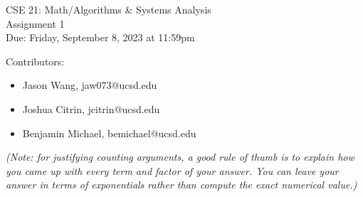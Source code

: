 \documentclass[10pt,letterpaper,unboxed,cm]{article}
\begin{document}
\begin{center}
{\LARGE CSE 21: Math/Algorithms \& Systems Analysis}\\
{\Large Assignment 1}\\
{\large Due: Friday, September 8, 2023 at 11:59pm}
\end{center}


{\large Contributors:}
\begin{itemize}
    \item Jason Wang, jaw073@ucsd.edu
    \item Joshua Citrin, jcitrin@ucsd.edu
    \item Benjamin Michael, bemichael@ucsd.edu
\end{itemize}

\emph{(Note: for justifying counting arguments, a good rule of thumb is to explain how you came up with every term and factor of your answer. You can leave
your answer in terms of exponentials rather than compute the exact numerical value.)}
\end{document}
